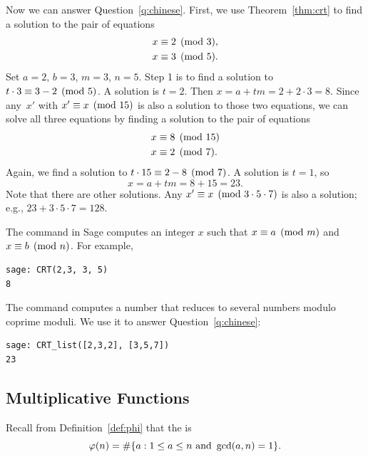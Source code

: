 Now we can answer Question~\ref{q:chinese}.
First, we use Theorem~\ref{thm:crt}
to find a solution to the pair of equations
\begin{align*}
x &\equiv 2 \pmod{3},\\
x &\equiv 3 \pmod{5}.
\end{align*}
Set $a=2$, $b=3$, $m=3$, $n=5$.
Step 1 is to find a solution to $t\cdot 3 \equiv 3-2\pmod{5}$.
A solution is $t=2$.  Then $x=a+tm=2+2\cdot 3 = 8$.
Since any~$x'$ with $x'\equiv x\pmod{15}$ is also a solution to
those two equations, we can solve all three equations by
finding a solution to the pair of equations
\begin{align*}
x &\equiv 8 \pmod{15}\\
x &\equiv 2 \pmod{7}.
\end{align*}
Again, we find a solution to $t\cdot 15 \equiv 2-8\pmod{7}$.
A solution is $t = 1$, so
$$x=a+tm=8+15=23.$$
Note that there are other solutions.  Any $x'\equiv x\pmod{3\cdot 5\cdot 7}$
is also a solution; e.g., $23+3\cdot 5\cdot 7 = 128$.

\begin{sg}
The  command in Sage computes an integer $x$
such that $x\equiv a\pmod{m}$ and $x\equiv b\pmod{n}$.  For example,
\begin{verbatim}
sage: CRT(2,3, 3, 5)
8
\end{verbatim}
\noindent{}The  command computes a number that reduces to
several numbers modulo coprime moduli.  We use
it to answer Question~\ref{q:chinese}:
\begin{verbatim}
sage: CRT_list([2,3,2], [3,5,7])
23
\end{verbatim}
\end{sg}

\subsection{Multiplicative Functions}%
\label{sec:multi_funcs}%
Recall from Definition~\ref{def:phi}
that the  is
$$
  \varphi(n) = \#\{a : 1\leq a \leq n\text{ and }\gcd(a,n)=1\}.
$$

